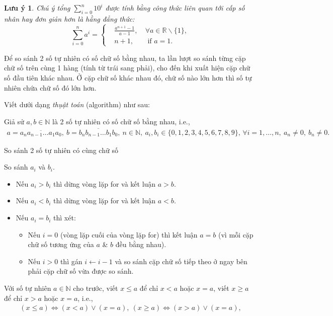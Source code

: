 \documentclass{article}
\numberwithin{equation}{section}
\newtheorem{remark}{Lưu ý}[section]
\begin{document}
\begin{remark}
	Chú ý tổng $\sum_{i=0}^n 10^i$ được tính bằng công thức liên quan tới \textit{cấp số nhân} hay đơn giản hơn là hằng đẳng thức:
	\begin{equation*}
		\sum_{i=0}^n a^i = \left\{\begin{split}
			&\frac{a^{n+1} - 1}{a - 1},\ &\forall a\in\mathbb{R}\backslash\{1\},\\
			&n + 1,&\mbox{ if } a = 1.
		\end{split}\right.
	\end{equation*}
\end{remark}

\begin{tcolorbox}
	Để so sánh 2 số tự nhiên có số chữ số bằng nhau, ta lần lượt so sánh từng cặp chữ số trên cùng 1 hàng (tính từ trái sang phải), cho đến khi xuất hiện cặp chữ số đầu tiên khác nhau. Ở cặp chữ số khác nhau đó, chữ số nào lớn hơn thì số tự nhiên chứa chữ số đó lớn hơn.
\end{tcolorbox}
Viết dưới dạng \textit{thụật toán} (algorithm) như sau:

Giả sử $a,b\in\mathbb{N}$ là 2 số tự nhiên có số chữ số bằng nhau, i.e.,
\begin{align*}
	a = \overline{a_na_{n-1}\ldots a_1a_0},\ b = \overline{b_nb_{n-1}\ldots b_1b_0},\ n\in\mathbb{N},\ a_i,b_i\in\{0,1,2,3,4,5,6,7,8,9\},\,\forall i = 1,\ldots,n,\ a_n\ne 0,\ b_n\ne 0.
\end{align*}

\begin{algorithm}
	\caption{So sánh 2 số tự nhiên có cùng chữ số}\label{alg:compare naturals with same digits}
	\begin{algorithmic}[1]
		 So sánh $a_i$ và $b_i$.
		\begin{itemize}
			\item Nếu $a_i > b_i$ thì dừng vòng lặp for và kết luận $a > b$.
			\item Nếu $a_i < b_i$ thì dừng vòng lặp for và kết luận $a < b$.
			\item Nếu $a_i = b_i$ thì xét:
			\begin{itemize}
				\item Nếu $i = 0$ (vòng lặp cuối của vòng lặp for) thì kết luận $a = b$ (vì mỗi cặp chữ số tương ứng của $a$ \& $b$ đều bằng nhau).
				\item Nếu $i > 0$ thì gán $i\leftarrow i - 1$ và so sánh cặp chữ số tiếp theo ở ngay bên phải cặp chữ số vừa được so sánh.
			\end{itemize}			 
		\end{itemize}		
		\EndFor
	\end{algorithmic}
\end{algorithm}
Với số tự nhiên $a\in\mathbb{N}$ cho trước, viết $x\le a$ để chỉ $x < a$ hoặc $x = a$, viết $x\ge a$ để chỉ $x > a$ hoặc $x = a$, i.e.,
\begin{align*}
	(x\le a)\Leftrightarrow(x < a)\lor(x = a),\ (x\ge a)\Leftrightarrow(x > a)\lor(x = a),
\end{align*}
\end{document}
